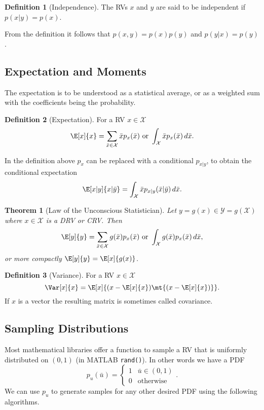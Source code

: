 \documentclass[]{hsrzf}
\theoremstyle{plain}
\newtheorem{thm}{Theorem}[section]
\theoremstyle{definition}
\newtheorem{defn}{Definition}[section]
\theoremstyle{remark}
\begin{document}

\begin{defn}[Independence]
  The RVs $x$ and $y$ are said to be independent if $p(x|y) = p(x)$.
\end{defn}

From the definition it follows that $p(x,y) = p(x)p(y)$ and $p(y|x) = p(y)$.

\subsection{Expectation and Moments}

The expectation is to be understood as a statistical average, or as a weighted
sum with the coefficients being the probability.

\begin{defn}[Expectation]
  For a RV $x \in \mathcal{X}$
  \[
    \E[x]{x}
       = \sum_{\bar{x} \in \mathcal{X}} \bar{x} p_x(\bar{x})
       \text{ or }
       \int_\mathcal{X} \bar{x} p_x(\bar{x}) \, d\bar{x}.
  \]
\end{defn}

In the definition above $p_x$ can be replaced with a conditional $p_{x|y}$, to
obtain the conditional expectation
\[
  \E[x|y]{x | \bar{y}} 
    = \int_\mathcal{X} \bar{x} p_{x|y}(\bar{x} | \bar{y}) \, d\bar{x}.
\]

\begin{thm}[Law of the Unconscious Statistician]
  Let $y = g(x) \in \mathcal{Y} = g(\mathcal{X})$ where $x \in \mathcal{X}$ is
  a DRV or CRV. Then
  \[
    \E[y]{y} = \sum_{\bar{x} \in \mathcal{X}} g(\bar{x}) p_x(\bar{x})
      \text{ or }
      \int_\mathcal{X} g(\bar{x}) p_x(\bar{x}) \, d\bar{x},
  \]
  or more compactly $\E[y]{y} = \E[x]{g(x)}$.
\end{thm}

\begin{defn}[Variance]
  For a RV $x \in \mathcal{X}$
  \[
    \Var[x]{x} = \E[x]{(x - \E[x]{x})\mt{(x - \E[x]{x})}}.
  \]
  If $x$ is a vector the resulting matrix is sometimes called covariance.
\end{defn}

\subsection{Sampling Distributions} 
\label{sec:probability-review:sampling-distributions}

Most mathematical libraries offer a function to sample a RV that is uniformly
distributed on $(0,1)$ (in MATLAB \texttt{rand()}). In other words we have a
PDF
\[
  p_u(\bar{u}) = \begin{cases}
    1 & \bar{u} \in (0,1) \\
    0 & \text{otherwise}
  \end{cases}.
\]
We can use $p_u$ to generate samples for any other desired PDF using the
following algorithms.
\end{document}
